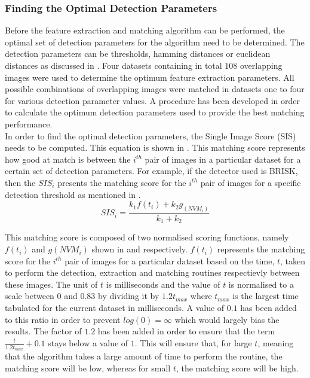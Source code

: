 \documentclass{article}
\begin{document}
\subsubsection{Finding the Optimal Detection Parameters}
\label{sec:optimalParameters}
Before the feature extraction and matching algorithm can be performed, the optimal set of detection parameters for the algorithm need to be determined. The detection parameters can be thresholds, hamming distances or euclidean distances as discussed in . Four datasets containing in total $108$ overlapping images were used to determine the optimum feature extraction parameters. All possible combinations of overlapping images were matched in datasets one to four for various detection parameter values. A procedure has been developed in order to calculate the optimum detection parameters used to provide the best matching performance.\\
In order to find the optimal detection parameters, the Single Image Score (SIS) needs to be computed. This equation is shown in . This matching score represents how good at match is between the $i^{th}$ pair of images in a particular dataset for a certain set of detection parameters. For example, if the detector used is BRISK, then the $SIS_{i}$ presents the matching score for the $i^{th}$ pair of images for a specific detection threshold as mentioned in . \\

\begin{equation}
SIS_{i} = \frac{k_1 f(t_{i}) + k_2 g_(NVM_{i})}{k_1 + k_2}
\label{eqn:optimalParameters}
\end{equation}

This matching score is composed of two normalised scoring functions, namely $f(t_{i})$ and $g(NVM_{i})$ shown in  and  respectively. $f(t_{i})$ represents the matching score for the $i^{th}$ pair of images for a particular dataset based on the time, $t$, taken to perform the detection, extraction and matching routines respectievly between these images. The unit of $t$ is milliseconds and the value of $t$ is normalised to a scale between $0$ and $0.83$ by dividing it by $1.2 t_{max}$ where $t_{max}$ is the largest time tabulated for the current dataset in milliseconds. A value of $0.1$ has been added to this ratio in order to prevent $log(0) = \infty$ which would largely bias the results. The factor of $1.2$ has been added in order to ensure that the term $\frac{t}{1.2 t_{max}} + 0.1$ stays below a value of $1$. This will ensure that, for large $t$, meaning that the algorithm takes a large amount of time to perform the routine, the matching score will be low, whereas for small $t$, the matching score will be high. \\
\end{document}

